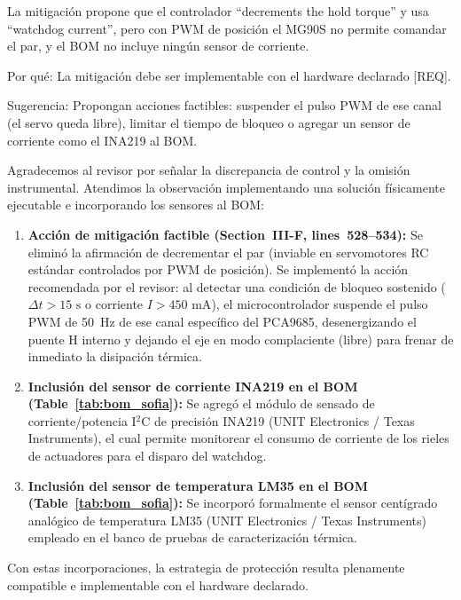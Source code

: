 \documentclass{LabDSTresponse}
\begin{document}
{La mitigación propone que el controlador “decrements the hold torque” y usa “watchdog current”, pero con PWM de posición el MG90S no permite comandar el par, y el BOM no incluye ningún sensor de corriente.

Por qué: La mitigación debe ser implementable con el hardware declarado [REQ].

Sugerencia: Propongan acciones factibles: suspender el pulso PWM de ese canal (el servo queda libre), limitar el tiempo de bloqueo o agregar un sensor de corriente como el INA219 al BOM.}
{Agradecemos al revisor por señalar la discrepancia de control y la omisión instrumental. Atendimos la observación implementando una solución físicamente ejecutable e incorporando los sensores al BOM:
\begin{enumerate}
    \item \textbf{Acción de mitigación factible (Section~III-F, lines~528--534):} Se eliminó la afirmación de decrementar el par (inviable en servomotores RC estándar controlados por PWM de posición). Se implementó la acción recomendada por el revisor: al detectar una condición de bloqueo sostenido ($\Delta t > 15\text{ s}$ o corriente $I > 450\text{ mA}$), el microcontrolador suspende el pulso PWM de 50~Hz de ese canal específico del PCA9685, desenergizando el puente H interno y dejando el eje en modo complaciente (libre) para frenar de inmediato la disipación térmica.
    \item \textbf{Inclusión del sensor de corriente INA219 en el BOM (Table~\ref{tab:bom_sofia}):} Se agregó el módulo de sensado de corriente/potencia I$^2$C de precisión INA219 (UNIT Electronics / Texas Instruments), el cual permite monitorear el consumo de corriente de los rieles de actuadores para el disparo del watchdog.
    \item \textbf{Inclusión del sensor de temperatura LM35 en el BOM (Table~\ref{tab:bom_sofia}):} Se incorporó formalmente el sensor centígrado analógico de temperatura LM35 (UNIT Electronics / Texas Instruments) empleado en el banco de pruebas de caracterización térmica.
\end{enumerate}
Con estas incorporaciones, la estrategia de protección resulta plenamente compatible e implementable con el hardware declarado.}
\end{document}
